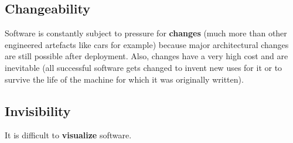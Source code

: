 \documentclass[a4paper,11pt]{report}
\begin{document}
\subsection{Changeability}
Software is constantly subject to pressure for \textbf{changes} (much more than
other engineered artefacts like cars for example) because major architectural
changes are still possible after deployment. Also, changes have a very high cost
and are inevitable (all successful software gets changed to invent new uses for
it or to survive the life of the machine for which it was originally written).

\subsection{Invisibility}
It is difficult to \textbf{visualize} software.
\end{document}
